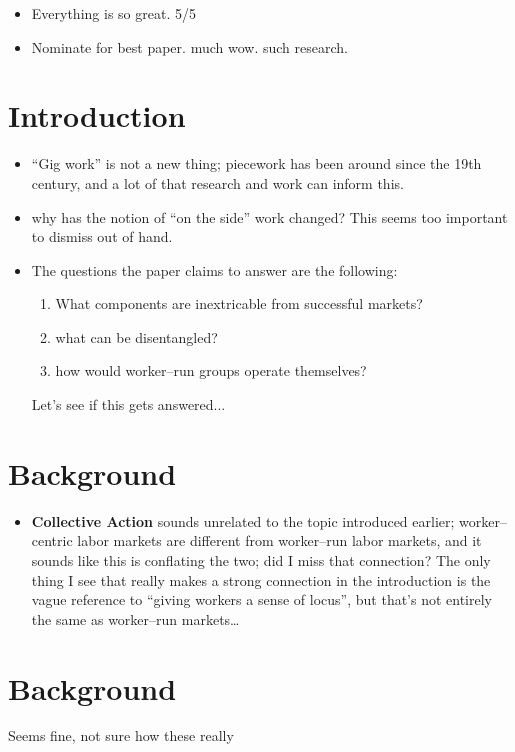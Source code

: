 \documentclass[11pt]{article}
\begin{document}
\begin{itemize}
\item
Everything is so great. 5/5
\item
Nominate for best paper. much wow. such research.
\end{itemize}

\section*{Introduction}
\begin{itemize}
\item
``Gig work'' is not a new thing; piecework has been around since the 19th century, and a lot of that research and work can inform this.
\item why has the notion of ``on the side'' work changed? This seems too important to dismiss out of hand.
\item The questions the paper claims to answer are the following:
\begin{enumerate}
\item
What components are inextricable from successful markets?
\item
what can be disentangled?
\item
how would worker--run groups operate themselves?
\end{enumerate}
Let's see if this gets answered...
\end{itemize}

\section*{Background}
\begin{itemize}
\item \textbf{Collective Action} sounds unrelated to the topic introduced earlier; worker--centric labor markets are different from worker--run labor markets, and it sounds like this is conflating the two; did I miss that connection? The only thing I see that really makes a strong connection in the introduction is the vague reference to ``giving workers a sense of locus'', but that's not entirely the same as worker--run markets\ldots
\end{itemize}

\section*{Background}
Seems fine, not sure how these really 
\end{document}
